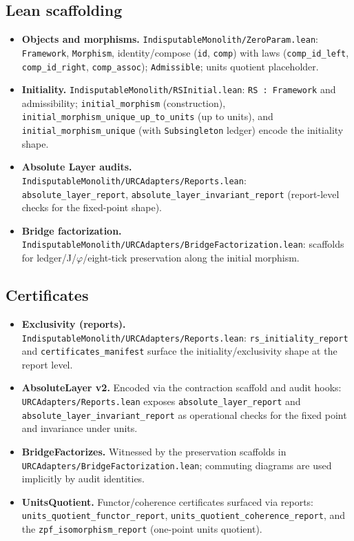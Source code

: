 \documentclass[11pt]{article}
\begin{document}
\subsection{Lean scaffolding}
\begin{itemize}
  \item \textbf{Objects and morphisms.} \texttt{IndisputableMonolith/ZeroParam.lean}: \texttt{Framework}, \texttt{Morphism}, identity/compose (\texttt{id}, \texttt{comp}) with laws (\texttt{comp\_id\_left}, \texttt{comp\_id\_right}, \texttt{comp\_assoc}); \texttt{Admissible}; units quotient placeholder.
  \item \textbf{Initiality.} \texttt{IndisputableMonolith/RSInitial.lean}: \texttt{RS : Framework} and admissibility; \texttt{initial\_morphism} (construction), \texttt{initial\_morphism\_unique\_up\_to\_units} (up to units), and \texttt{initial\_morphism\_unique} (with \texttt{Subsingleton} ledger) encode the initiality shape.
  \item \textbf{Absolute Layer audits.} \texttt{IndisputableMonolith/URCAdapters/Reports.lean}: \texttt{absolute\_layer\_report}, \texttt{absolute\_layer\_invariant\_report} (report\mbox{-}level checks for the fixed\mbox{-}point shape).
  \item \textbf{Bridge factorization.} \texttt{IndisputableMonolith/URCAdapters/BridgeFactorization.lean}: scaffolds for ledger/J/\(\varphi\)/eight\mbox{-}tick preservation along the initial morphism.
\end{itemize}

\subsection{Certificates}
\begin{itemize}
  \item \textbf{Exclusivity (reports).} \texttt{IndisputableMonolith/URCAdapters/Reports.lean}: \texttt{rs\_initiality\_report} and \texttt{certificates\_manifest} surface the initiality/exclusivity shape at the report level.
  \item \textbf{AbsoluteLayer v2.} Encoded via the contraction scaffold and audit hooks: \texttt{URCAdapters/Reports.lean} exposes \texttt{absolute\_layer\_report} and \texttt{absolute\_layer\_invariant\_report} as operational checks for the fixed point and invariance under units.
  \item \textbf{BridgeFactorizes.} Witnessed by the preservation scaffolds in \texttt{URCAdapters/BridgeFactorization.lean}; commuting diagrams are used implicitly by audit identities.
  \item \textbf{UnitsQuotient.} Functor/coherence certificates surfaced via reports: \texttt{units\_quotient\_functor\_report}, \texttt{units\_quotient\_coherence\_report}, and the \texttt{zpf\_isomorphism\_report} (one\mbox{-}point units quotient).
\end{itemize}
\end{document}
